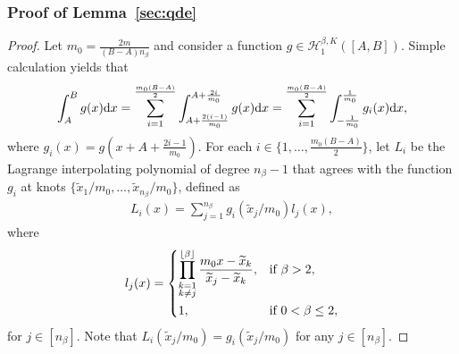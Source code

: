 \documentclass[twoside,11pt]{article}
\def\cH{\mathcal H}
\newcommand{\be}{\begin{equation}}
\newcommand{\ee}{\end{equation}}
\newcommand{\bean}{\setlength\arraycolsep{1pt}\begin{eqnarray*}}
\newcommand{\eean}{\end{eqnarray*}}
\def\d{{\rm d}}
\begin{document}
\subsubsection{Proof of Lemma~\ref{sec:qde}}

\begin{proof}
Let $m_0 = \frac{2m}{(B-A){n_{\beta}}}$ and consider a function $g \in \cH_{1}^{\beta,K}([A,B])$.
Simple calculation yields that
\be
\int_{A}^B g(x) \d x = \sum_{i=1}^{\frac{m_0(B-A)}{2}} \int_{A+\frac{2(i-1)}{m_0}}^{A+\frac{2i}{m_0}} g (x) \d x = \sum_{i=1}^{\frac{m_0(B-A)}{2}} \int_{-\frac{1}{m_0}}^{\frac{1}{m_0}} g_i(x) \d x, \label{eqn:partition}
\ee
where $g_i(x) = g(x +A+\frac{2i-1}{m_0} )$.
For each $i \in \{1,\ldots, \frac{m_0(B-A)}{2}\}$, let $L_i$ be the Lagrange interpolating polynomial of degree ${n_{\beta}}-1$ that agrees with the function $g_i$ at knots $\{\widetilde x_1 / m_0, \ldots, \widetilde x_{{n_{\beta}}} / m_0 \}$, defined as 
\bean
L_i(x) = \sum_{j=1}^{{n_{\beta}}} g_i(\widetilde x_j/m_0) l_j(x),
\eean
where \bean
l_j(x) = \begin{dcases}
  \prod_{\substack{k = 1 \\ k \neq j}}^{\lfloor \beta \rfloor} \frac{m_0 x-\widetilde x_k}{\widetilde x_j - \widetilde x_k}, & \text{if }
       \beta > 2,
\\
  1, & \text{if } 0<\beta \leq 2,
\end{dcases}
\eean
for $j \in [{n_{\beta}}]$.
Note that $L_i(\widetilde x_j /m_0) = g_i(\widetilde x_j / m_0)$ for any $j \in [{n_{\beta}}]$.


\end{proof}
\end{document}

